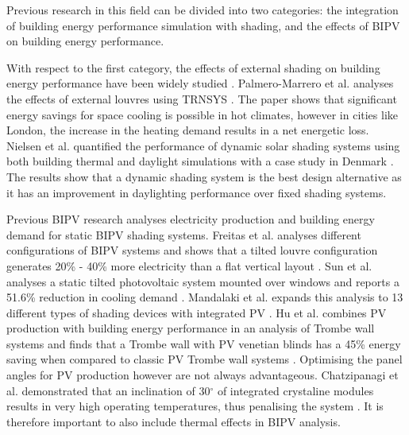 
Previous research in this field can be divided into two categories: the integration of building energy performance simulation with shading, and the effects of BIPV on building energy performance. 

With respect to the first category, the effects of external shading on building energy performance have been widely studied \cite{bellia2014overview}. Palmero-Marrero et al. analyses the effects of external louvres using TRNSYS \cite{palmero2010effect}. The paper shows that significant energy savings for space cooling is possible in hot climates, however in cities like London, the increase in the heating demand results in a net energetic loss. Nielsen et al. quantified the performance of dynamic solar shading systems using both building thermal and daylight simulations with a case study in Denmark \cite{nielsen2011quantifying}. The results show that a dynamic shading system is the best design alternative as it has an improvement in daylighting performance over fixed shading systems.\ 

Previous BIPV research analyses electricity production and building energy demand for static BIPV shading systems. Freitas et al. analyses different configurations of BIPV systems and shows that a tilted louvre configuration generates 20\% - 40\% more electricity than a flat vertical layout \cite{freitas2015maximizing}. Sun et al. analyses a static tilted photovoltaic system mounted over windows and reports a 51.6\% reduction in cooling demand \cite{sun2012optimum}. Mandalaki et al. expands this analysis to 13 different types of shading devices with integrated PV \cite{mandalaki2012assessment}. Hu et al. combines PV production with building energy performance in an analysis of Trombe wall systems and finds that a Trombe wall with PV venetian blinds has a 45\% energy saving when compared to classic PV Trombe wall systems \cite{hu2017comparative}. Optimising the panel angles for PV production however are not always advantageous. Chatzipanagi et al. demonstrated that an inclination of 30$^{\circ}$ of integrated crystaline modules results in very high operating temperatures, thus penalising the system \cite{chatzipanagi2016bipv}. It is therefore important to also include thermal effects in BIPV analysis. \\

